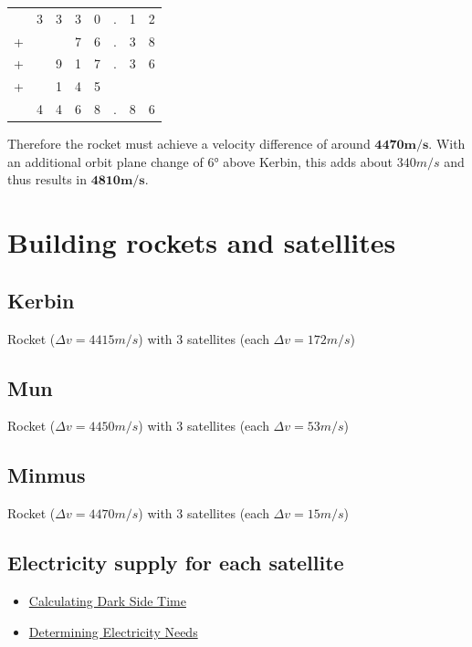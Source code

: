 \documentclass[12pt,paper=A4,numbers=noenddot,bibliography=totoc,listof=totoc,DIV=11,BCOR=1mm]{scrreprt}
\begin{document}
\begin{flushright}
\begin{tabular}{c@{\,}c@{\,}c@{\,}c@{\,}c@{\,}c@{\,}c@{\,}c}
  & 3 & 3 & 3 & 0 & . & 1 & 2 \\ 
+ &   &   & 7 & 6 & . & 3 & 8 \\ 
+ &   & 9 & 1 & 7 & . & 3 & 6 \\ 
+ &   & 1 & 4 & 5 &   &   &   \\ 
\hline 
  & 4 & 4 & 6 & 8 & . & 8 & 6 \\ 
\end{tabular}
\end{flushright}

\begin{flushleft}
Therefore the rocket must achieve a velocity difference of around $\mathbf{4470m/s}$.
With an additional orbit plane change of 6° above Kerbin, this adds about $340m/s$ and thus results in $\mathbf{4810m/s}$.
\end{flushleft}



\chapter{Building rockets and satellites}

\section*{Kerbin}
Rocket ($\Delta v = 4415m/s$) with 3 satellites (each $\Delta v = 172m/s$) \\
\section*{Mun}
Rocket ($\Delta v = 4450m/s$) with 3 satellites (each $\Delta v = 53m/s$) \\
\section*{Minmus}
Rocket ($\Delta v = 4470m/s$) with 3 satellites (each $\Delta v = 15m/s$) \\
\section*{Electricity supply for each satellite}
\begin{itemize}
\item \href{https://youtu.be/T123t3lR_Ck}{Calculating Dark Side Time}
\item \href{https://youtu.be/5VPLfKv4jKc}{Determining Electricity Needs}
\end{itemize}
\end{document}
